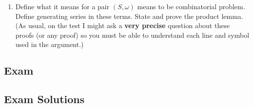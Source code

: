 \documentclass{report}
\begin{document}
{\begin{enumerate}
{              \begin{align*}
                  |A_2^c \cap A_4^c \cap A_6^c \cap A_8^c| = |S| - \sum |A_i| + \sum |A_i \cap A_j| - \sum |A_i \cap A_j \cap A_k| + |A_2 \cap A_4 \cap A_6 \cap A_8| \\
              \end{align*}

              Each sum can be calculated as follows:

              \begin{align*}
                  \sum |A_{i_1} \cap A_{i_2} \cdots A_{i_k}| & = \binom{4}{k}(8-k)! \\
              \end{align*}

              This is because there are $4$ ways to choose the even numbers that are fixed.
              For each of these choices, there are $8-k$ ways to choose the remaining numbers. \\

              So, we have:

              \begin{align*}
                  8! - \binom{4}{1}7! + \binom{4}{2} 6! - \binom{4}{3} 5! + \binom{4}{4} 4!
              \end{align*}
          }

    \item Define what it means for a pair $(S, \omega)$ means to be combinatorial
          problem. Define generating series in these terms. State and prove the
          product lemma. (As usual, on the test I might ask a \textbf{very precise}
          question about these proofs (or any proof) so you must be able to
          understand each line and symbol used in the argument.)
\end{enumerate}

\subsection*{Exam}

\subsection*{Exam Solutions}

}
\end{document}
